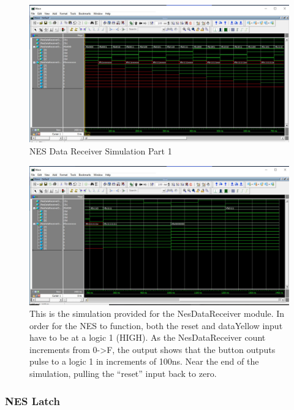 \documentclass[a4paper]{article}
\begin{document}
\begin{figure}[H]
  \centering
    \includegraphics[width=.85\textwidth]{images/ModelSim/nesdatare.JPG}
	\caption{NES Data Receiver Simulation Part 1}
    \label{fig:data_receiver_sim}
\end{figure}

\begin{figure}[H]
  \centering
    \includegraphics[width=.85\textwidth]{images/ModelSim/nesdatare2.JPG}
	\caption{This is the simulation provided for the NesDataReceiver module. In order for the NES to function, both the reset and dataYellow input have to be at a logic 1 (HIGH). As the NesDataReceiver count increments from 0->F, the output shows that the button outputs pulse to a logic 1 in increments of 100ns. Near the end of the simulation, pulling the “reset” input back to zero.}
    \label{fig:data_receiver_sim}
\end{figure}

\subsubsection{NES Latch}
\end{document}
